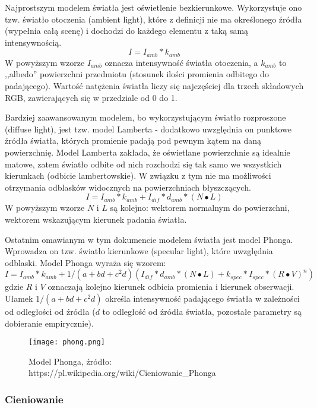 Najprostszym modelem światła jest oświetlenie bezkierunkowe. Wykorzystuje ono tzw. światło otoczenia (ambient light), które z definicji nie ma określonego źródła (wypełnia całą scenę) i dochodzi do każdego elementu z taką samą intensywnością.
$$I = I_{amb} * k_{amb}$$
W powyższym wzorze $I_{amb}$ oznacza intensywność światła otoczenia, a $k_{amb}$ to ,,albedo'' powierzchni przedmiotu (stosunek ilości promienia odbitego do padającego). Wartość natężenia światła liczy się najczęściej dla trzech składowych RGB, zawierających się w przedziale od 0 do 1.


Bardziej zaawansowanym modelem, bo wykorzystującym światło rozproszone (diffuse light), jest tzw. model Lamberta - dodatkowo uwzględnia on punktowe źródła światła, których promienie padają pod pewnym kątem na daną powierzchnię. Model Lamberta zakłada, że oświetlane powierzchnie są idealnie matowe, zatem światło odbite od nich rozchodzi się tak samo we wszystkich kierunkach (odbicie lambertowskie). W związku z tym nie ma możliwości otrzymania odblasków widocznych na powierzchniach błyszczących.
$$I = I_{amb} * k_{amb} + I_{dif} * d_{amb} * (N \bullet L)$$
W powyższym wzorze $N$ i $L$ są kolejno: wektorem normalnym do powierzchni, wektorem wskazującym kierunek padania światła.


Ostatnim omawianym w tym dokumencie modelem światła jest model Phonga. Wprowadza on tzw. światło kierunkowe (specular light), które uwzględnia odblaski. Model Phonga wyraża się wzorem:
$$I = I_{amb} * k_{amb} + 1/(a + bd + c^2d)(I_{dif} * d_{amb} * (N \bullet L) + k_{spec} * I_{spec} * (R \bullet V)^n)$$
gdzie $R$ i $V$ oznaczają kolejno kierunek odbicia promienia i kierunek obserwacji. Ułamek $1/(a + bd + c^2d)$ określa intensywność padającego światła w zależności od odległości od źródła ($d$ to odległość od źródła światła, pozostałe parametry są dobieranie empirycznie).

\begin{figure}[h!]
\centering
  \caption{Model Phonga, źródło: https://pl.wikipedia.org/wiki/Cieniowanie\_Phonga}
  \texttt{[image: phong.png]}
\end{figure}

\subsubsection{Cieniowanie}

